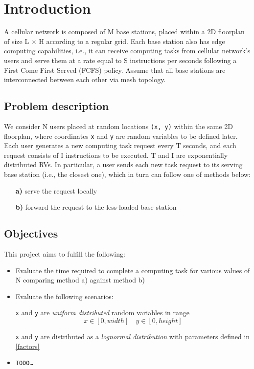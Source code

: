 \documentclass{article}
\begin{document}
\newpage
\tableofcontents
\newpage

\setcounter{page}{1}

\section{Introduction}
A cellular network is composed of M base stations, placed within a 2D floorplan of size L $\times$ H
according to a regular grid. Each base station also has edge computing capabilities, i.e., it can receive
computing tasks from cellular network's users and serve them at a rate equal to S instructions per
seconds following a First Come First Served (FCFS) policy. Assume that all base stations are
interconnected between each other via mesh topology.
\subsection{Problem description}
We consider N users placed at random locations \texttt{(x, y)} within the same 2D floorplan, where coordinates
\texttt{x} and \texttt{y} are random variables to be defined later. Each user generates a new computing task request
every T seconds, and each request consists of I instructions to be executed. T and I are exponentially
distributed RVs. In particular, a user sends each new task request to its serving base station (i.e., the
closest one), which in turn can follow one of methods below:
\begin{itemize}
    \item [\textbf{a)}] serve the request locally
    \item [\textbf{b)}] forward the request to the less-loaded base station
\end{itemize}

\subsection{Objectives}
This project aims to fulfill the following:
\begin{itemize}
    \item Evaluate the time required to complete a computing task for various values of N comparing method a) against method b)
    \item Evaluate the following scenarios:
    
    \texttt{x} and \texttt{y} are \textit{uniform distributed} random variables in range \[x\in[0, width] \quad y\in[0, height]\]

    \texttt{x} and \texttt{y} are distributed as a \textit{lognormal distribution} with parameters defined in \autoref{factors}
    \item \texttt{TODO\dots}
\end{itemize}
\end{document}

